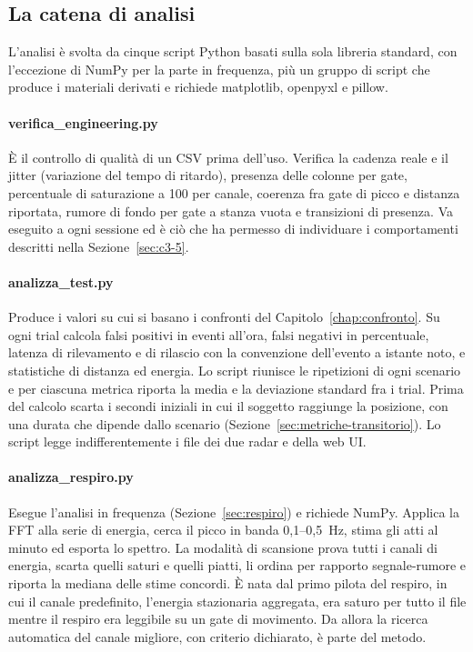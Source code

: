 \subsection{La catena di analisi}
\label{sec:c3-4-5}

L'analisi è svolta da cinque script Python basati sulla sola libreria standard, con l'eccezione di NumPy per la parte in frequenza, più un gruppo di script che produce i materiali derivati e richiede matplotlib, openpyxl e pillow.

\paragraph{verifica\_engineering.py}

È il controllo di qualità di un CSV prima dell'uso. Verifica la cadenza reale e il jitter (variazione del tempo di ritardo), presenza delle colonne per gate, percentuale di saturazione a 100 per canale, coerenza fra gate di picco e distanza riportata, rumore di fondo per gate a stanza vuota e transizioni di presenza. Va eseguito a ogni sessione ed è ciò che ha permesso di individuare i comportamenti descritti nella Sezione~\ref{sec:c3-5}.

\paragraph{analizza\_test.py}

Produce i valori su cui si basano i confronti del Capitolo~\ref{chap:confronto}. Su ogni trial calcola falsi positivi in eventi all'ora, falsi negativi in percentuale, latenza di rilevamento e di rilascio con la convenzione dell'evento a istante noto, e statistiche di distanza ed energia. Lo script riunisce le ripetizioni di ogni scenario e per ciascuna metrica riporta la media e la deviazione standard fra i trial. Prima del calcolo scarta i secondi iniziali in cui il soggetto raggiunge la posizione, con una durata che dipende dallo scenario (Sezione~\ref{sec:metriche-transitorio}). Lo script legge indifferentemente i file dei due radar e della web UI.

\paragraph{analizza\_respiro.py}

Esegue l'analisi in frequenza (Sezione~\ref{sec:respiro}) e richiede NumPy. Applica la FFT alla serie di energia, cerca il picco in banda 0,1--0,5~Hz, stima gli atti al minuto ed esporta lo spettro. La modalità di scansione prova tutti i canali di energia, scarta quelli saturi e quelli piatti, li ordina per rapporto segnale-rumore e riporta la mediana delle stime concordi. È nata dal primo pilota del respiro, in cui il canale predefinito, l'energia stazionaria aggregata, era saturo per tutto il file mentre il respiro era leggibile su un gate di movimento. Da allora la ricerca automatica del canale migliore, con criterio dichiarato, è parte del metodo.

